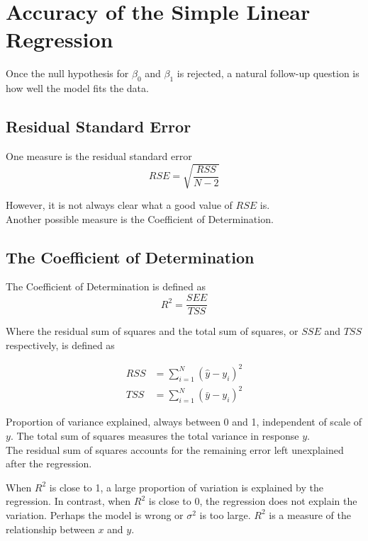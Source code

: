 \section{Accuracy of the Simple Linear Regression}
Once the null hypothesis for $\beta_0$ and $\beta_1$ is rejected, a natural follow-up question is how well the model fits the data.

\subsection{Residual Standard Error}
One measure is the residual standard error
\[RSE=\sqrt{\frac{RSS}{N-2}}\]

However, it is not always clear what a good value of $RSE$ is.\\
Another possible measure is the Coefficient of Determination.

\subsection{The Coefficient of Determination}
The Coefficient of Determination is defined as
\[
R^2=\frac{SEE}{TSS}
\]

Where the residual sum of squares and the total sum of squares, or $SSE$ and $TSS$ respectively, is defined as

\begin{align*}
   RSS &=\sum_{i=1}^{N}(\hat{y}-y_i)^2 \\
   TSS &=\sum_{i=1}^{N}(\bar{y}-y_i)^2
\end{align*}

Proportion of variance explained, always between 0 and 1, independent of scale of $y$.
The total sum of squares measures the total variance in response $y$.\\
The residual sum of squares accounts for the remaining error left unexplained after the regression.

When $R^2$ is close to 1, a large proportion of variation is explained by the regression. In contrast, when $R^2$ is close to 0, the regression does not explain the variation. Perhaps the model is wrong or $\sigma^2$ is too large.
$R^2$ is a measure of the relationship between $x$ and $y$.